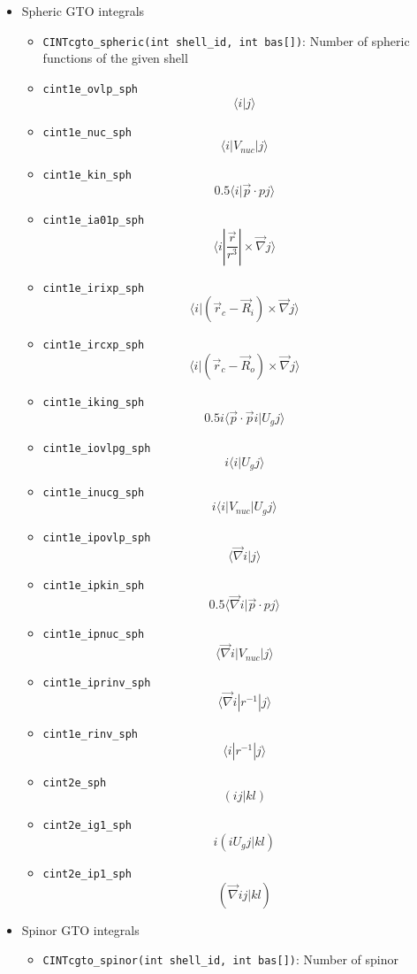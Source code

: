 \documentclass{article}
\begin{document}
\begin{itemize}
\begin{itemize}
  \end{itemize}
\item
  Spheric GTO integrals
  \begin{itemize}
  \item
    \verb!CINTcgto_spheric(int shell_id, int bas[])!: Number of spheric
    functions of the given shell
  \item
    \verb!cint1e_ovlp_sph! \[\langle  i| j\rangle \]
  \item
    \verb!cint1e_nuc_sph! \[\langle  i| V_{nuc}| j\rangle \]
  \item
    \verb!cint1e_kin_sph! \[0.5\langle i| \vec{p} \cdot pj\rangle \]
  \item
    \verb!cint1e_ia01p_sph!
    \[\langle i| \frac{\vec{r}}{r^3}| \times \vec{\nabla} j\rangle \]
  \item
    \verb!cint1e_irixp_sph!
    \[\langle i| (\vec{r}_c-\vec{R}_i) \times \vec{\nabla} j\rangle \]
  \item
    \verb!cint1e_ircxp_sph!
    \[\langle i| (\vec{r}_c-\vec{R}_o) \times \vec{\nabla} j\rangle \]
  \item
    \verb!cint1e_iking_sph!
    \[0.5i\langle \vec{p} \cdot \vec{p} i| U_gj\rangle \]
  \item
    \verb!cint1e_iovlpg_sph! \[i\langle i| U_gj\rangle \]
  \item
    \verb!cint1e_inucg_sph! \[i\langle i| V_{nuc}| U_gj\rangle \]
  \item
    \verb!cint1e_ipovlp_sph! \[\langle \vec{\nabla} i|j\rangle \]
  \item
    \verb!cint1e_ipkin_sph!
    \[0.5\langle \vec{\nabla} i| \vec{p} \cdot pj\rangle \]
  \item
    \verb!cint1e_ipnuc_sph!
    \[\langle \vec{\nabla} i| V_{nuc}|j\rangle \]
  \item
    \verb!cint1e_iprinv_sph!
    \[\langle \vec{\nabla} i| r^{-1}|j\rangle \]
  \item
    \verb!cint1e_rinv_sph! \[\langle i| r^{-1} |j\rangle \]
  \item
    \verb!cint2e_sph! \[(ij|kl)\]
  \item
    \verb!cint2e_ig1_sph! \[i(i U_g j|kl)\]
  \item
    \verb!cint2e_ip1_sph! \[(\vec{\nabla} i j|kl)\]
  \end{itemize}
\item
  Spinor GTO integrals
  \begin{itemize}
  \item
    \verb!CINTcgto_spinor(int shell_id, int bas[])!: Number of spinor

\end{itemize}
\end{itemize}
\end{document}
